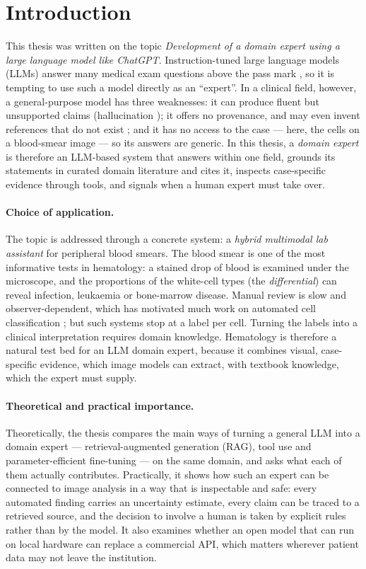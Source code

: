 \section{Introduction}

This thesis was written on the topic \emph{Development of a domain expert using a large language model like ChatGPT}. Instruction-tuned large language models (LLMs) answer many medical exam questions above the pass mark \cite{singhal2023}, so it is tempting to use such a model directly as an ``expert''. In a clinical field, however, a general-purpose model has three weaknesses: it can produce fluent but unsupported claims (hallucination \cite{ji2023}); it offers no provenance, and may even invent references that do not exist \cite{walters2023}; and it has no access to the case --- here, the cells on a blood-smear image --- so its answers are generic. In this thesis, a \emph{domain expert} is therefore an LLM-based system that answers within one field, grounds its statements in curated domain literature and cites it, inspects case-specific evidence through tools, and signals when a human expert must take over.

\paragraph{Choice of application.} The topic is addressed through a concrete system: a \emph{hybrid multimodal lab assistant} for peripheral blood smears. The blood smear is one of the most informative tests in hematology: a stained drop of blood is examined under the microscope, and the proportions of the white-cell types (the \emph{differential}) can reveal infection, leukaemia or bone-marrow disease. Manual review is slow and observer-dependent, which has motivated much work on automated cell classification \cite{acevedo2019,habibzadeh2018}; but such systems stop at a label per cell. Turning the labels into a clinical interpretation requires domain knowledge. Hematology is therefore a natural test bed for an LLM domain expert, because it combines visual, case-specific evidence, which image models can extract, with textbook knowledge, which the expert must supply.

\paragraph{Theoretical and practical importance.} Theoretically, the thesis compares the main ways of turning a general LLM into a domain expert --- retrieval-augmented generation (RAG), tool use and parameter-efficient fine-tuning --- on the same domain, and asks what each of them actually contributes. Practically, it shows how such an expert can be connected to image analysis in a way that is inspectable and safe: every automated finding carries an uncertainty estimate, every claim can be traced to a retrieved source, and the decision to involve a human is taken by explicit rules rather than by the model. It also examines whether an open model that can run on local hardware can replace a commercial API, which matters wherever patient data may not leave the institution.

